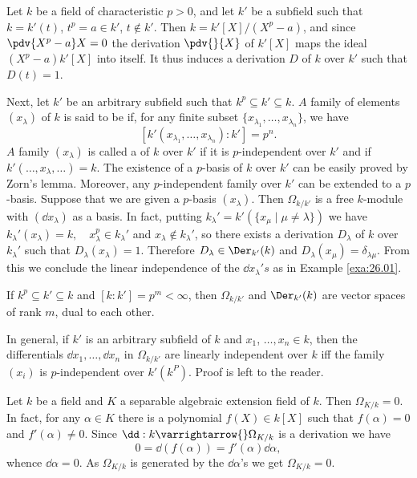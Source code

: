 \documentclass[../main]{subfiles}
\begin{document}
\begin{parexample}\label{exa:26.02}
Let $k$ be a field of characteristic $p>0$, and let $k'$ be a subfield such that $k=k'(t)$, $t^p=a \in k'$, $t \notin k'$. Then $k=k'[X] /(X^p-a)$, and since $\pdv{X^p-a}X= 0$ the derivation $\pdv{}{X}$ of $k'[X]$ maps the ideal $(X^p-a) k'[X]$ into itself. It thus induces a derivation $D$ of $k$ over $k'$ such that $D(t)=1$.

Next, let $k'$ be an arbitrary subfield such that $k^p \subseteq k'\subseteq k$. $A$ family of elements $(x_\lambda)$ of $k$ is said to be  if, for any finite subset $\{x_{\lambda_1}, \dots, x_{\lambda_n}\}$, we have \[[k'(x_{\lambda_1}, \dots, x_{\lambda_n}): k']=p^n.\] $A$ family $(x_\lambda)$ is called a  of $k$ over $k'$ if it is $p$-independent over $k'$ and if $k'(\dots, x_\lambda, \dots)=k$. The existence of a $p$-basis of $k$ over $k'$ can be easily proved by Zorn's lemma. Moreover, any $p$-independent family over $k'$ can be extended to a $p$-basis. Suppose that we are given a $p$-basis $(x_\lambda)$. Then $\Omega_{k / k'}$ is a free $k$-module with $(\dd x_\lambda)$ as a basis. In fact, putting $k_\lambda'=k'(\{x_{\mu} \mid \mu \neq \lambda\})$ we have $k_\lambda'(x_\lambda)=k,\quad x_\lambda^p \in k_\lambda'$ and $x_\lambda \notin k_\lambda'$, so there exists a derivation $D_\lambda$ of $k$ over $k_\lambda'$ such that $D_\lambda(x_\lambda)=1$. Therefore $D_\lambda \in \Der_{k'}(k)$ and $D_\lambda(x_{\mu})=\delta_{\lambda \mu}$. From this we conclude the linear independence of the $\dd x_\lambda' s$ as in Example \ref{exa:26.01}.

If $k^p \subseteq k' \subseteq k$ and $[k: k']=p^m<\infty$, then $\Omega_{k / k'}$ and $\Der_{k'}(k)$ are vector spaces of rank $m$, dual to each other.

In general, if $k'$ is an arbitrary subfield of $k$ and $x_1$, $\dots, x_n \in k$, then the differentials $\dd x_1, \dots, \dd x_n$ in $\Omega_{k / k'}$ are linearly independent over $k$ iff the family $(x_i)$ is $p$-independent over $k'(k^P)$. Proof is left to the reader.
\end{parexample}

\begin{parexample}
    Let $k$ be a field and $K$ a separable algebraic extension field of $k$. Then $\Omega_{K/k}=0$. In fact, for any $\alpha \in K$ there is a polynomial $f(X) \in k[X]$ such that $f(\alpha)=0$ and $f'(\alpha) \neq 0$. Since $\dd: k \varrightarrow{} \Omega_{K / k}$ is a derivation we have \[0=\dd(f(\alpha))=f'(\alpha) \dd \alpha,\] whence $\dd \alpha=0$. As $\Omega_{K / k}$ is generated by the $\dd \alpha$'s we get $\Omega_{K / k}=0$.
\end{parexample} 
\end{document}
